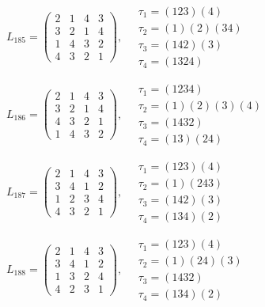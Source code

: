 $L_{185} = \begin{pmatrix} 2 & 1 & 4 & 3 \\ 3 & 2 & 1 & 4 \\ 1 & 4 & 3 & 2 \\ 4 & 3 & 2 & 1 \end{pmatrix}, \quad \begin{matrix} \tau_{1} = (1 2 3)(4) \\ \tau_{2} = (1)(2)(3 4) \\ \tau_{3} = (1 4 2)(3) \\ \tau_{4} = (1 3 2 4) \end{matrix}$

$L_{186} = \begin{pmatrix} 2 & 1 & 4 & 3 \\ 3 & 2 & 1 & 4 \\ 4 & 3 & 2 & 1 \\ 1 & 4 & 3 & 2 \end{pmatrix}, \quad \begin{matrix} \tau_{1} = (1 2 3 4) \\ \tau_{2} = (1)(2)(3)(4) \\ \tau_{3} = (1 4 3 2) \\ \tau_{4} = (1 3)(2 4) \end{matrix}$

$L_{187} = \begin{pmatrix} 2 & 1 & 4 & 3 \\ 3 & 4 & 1 & 2 \\ 1 & 2 & 3 & 4 \\ 4 & 3 & 2 & 1 \end{pmatrix}, \quad \begin{matrix} \tau_{1} = (1 2 3)(4) \\ \tau_{2} = (1)(2 4 3) \\ \tau_{3} = (1 4 2)(3) \\ \tau_{4} = (1 3 4)(2) \end{matrix}$

$L_{188} = \begin{pmatrix} 2 & 1 & 4 & 3 \\ 3 & 4 & 1 & 2 \\ 1 & 3 & 2 & 4 \\ 4 & 2 & 3 & 1 \end{pmatrix}, \quad \begin{matrix} \tau_{1} = (1 2 3)(4) \\ \tau_{2} = (1)(2 4)(3) \\ \tau_{3} = (1 4 3 2) \\ \tau_{4} = (1 3 4)(2) \end{matrix}$

